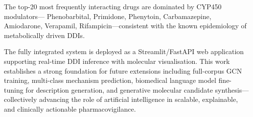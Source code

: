 \documentclass[conference]{IEEEtran}
\begin{document}
The top-20 most frequently interacting drugs are dominated by CYP450 modulators---
Phenobarbital, Primidone, Phenytoin, Carbamazepine, Amiodarone, Verapamil,
Rifampicin---consistent with the known epidemiology of metabolically driven DDIs.

The fully integrated system is deployed as a Streamlit/FastAPI web application supporting
real-time DDI inference with molecular visualisation. This work establishes a strong
foundation for future extensions including full-corpus GCN training, multi-class mechanism
prediction, biomedical language model fine-tuning for description generation, and
generative molecular candidate synthesis---collectively advancing the role of artificial
intelligence in scalable, explainable, and clinically actionable pharmacovigilance.

\end{document}
